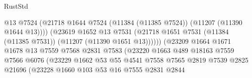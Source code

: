 \begin{lexlean}{RustStd}
\begin{coremodule}
                                            @13
                                            @7524
                                            (@21718
                                              @1644
                                              @7524
                                              (@11384 (@11385 @7524))
                                              (@11207 (@11390 @1644 @13))))
                                          (@23619
                                            @1652
                                            @13
                                            @7531
                                            (@21718
                                              @1651
                                              @7531
                                              (@11384 (@11385 @7531))
                                              (@11207 (@11390 @1651 @13))))))
                                      (@23209
                                        @1664
                                        @1671
                                        @1678
                                        @13
                                        @7559
                                        @7568
                                        @2831
                                        @7583
                                        (@23220
                                          @1663
                                          @489
                                          @18163
                                          @7559
                                          @7566
                                          @6076
                                          (@23229
                                            @1662
                                            @53
                                            @55
                                            @4541
                                            @7558
                                            @7565
                                            @2819
                                            @7539
                                            @2825
                                            @21696
                                            (@23228
                                              @1660
                                              @103
                                              @53
                                              @16
                                              @7555
                                              @2831
                                              @2844

\end{coremodule}
\end{lexlean}
